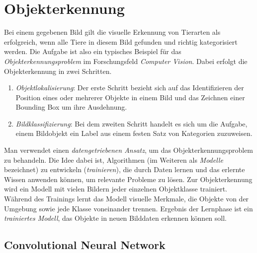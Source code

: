 \section{Objekterkennung} \label{sec:objectdetection}

Bei einem gegebenen Bild gilt die visuelle Erkennung von Tierarten als erfolgreich, wenn alle Tiere in diesem Bild gefunden und richtig kategorisiert werden. Die Aufgabe ist also ein typisches Beispiel für das \emph{Objekterkennungsproblem} im Forschungsfeld \emph{Computer Vision}. Dabei erfolgt die Objekterkennung in zwei Schritten.

\begin{enumerate}
	\item \emph{Objektlokalisierung}: Der erste Schritt bezieht sich auf das Identifizieren der Position eines oder mehrerer Objekte in einem Bild und das Zeichnen einer Bounding Box um ihre Ausdehnung.
	
	\item \emph{Bildklassifizierung}: Bei dem zweiten Schritt handelt es sich um die Aufgabe, einem Bildobjekt ein Label aus einem festen Satz von Kategorien zuzuweisen.
\end{enumerate}

Man verwendet einen \emph{datengetriebenen Ansatz}, um das Objekterkennungsproblem zu behandeln. Die Idee dabei ist, Algorithmen (im Weiteren als \emph{Modelle} bezeichnet) zu entwickeln (\emph{trainieren}), die durch Daten lernen und das erlernte Wissen anwenden können, um relevante Probleme zu lösen. Zur Objekterkennung wird ein Modell mit vielen Bildern jeder einzelnen Objektklasse trainiert. Während des Trainings lernt das Modell visuelle Merkmale, die Objekte von der Umgebung sowie jede Klasse voneinander trennen. Ergebnis der Lernphase ist ein \emph{trainiertes Modell}, das Objekte in neuen Bilddaten erkennen können soll.


\subsection{Convolutional Neural Network}

